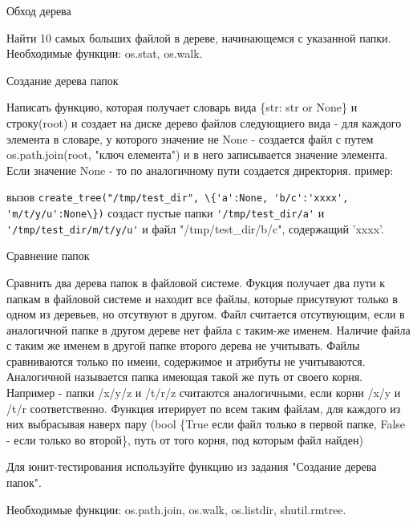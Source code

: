 \documentclass{article}
\begin{document}
\begin{center} Обход дерева \end{center}
Найти 10 самых больших файлой в дереве, начинающемся с указанной папки.
Необходимые функции: os.stat, os.walk.
\newpage

\begin{center} Создание дерева папок \end{center}
Написать функцию, которая получает словарь вида
\{str: str or None\} и строку(root) и создает на диске дерево файлов следующиего вида -
для каждого элемента в словаре, у которого значение не None - создается файл
с путем os.path.join(root, "ключ елемента") и в него записывается значение элемента.
Если значение None - то по аналогичному пути создается директория.
пример:

вызов \lstinline!create_tree("/tmp/test_dir", \{'a':None, 'b/c':'xxxx', 'm/t/y/u':None\})!
создаст пустые папки \lstinline!'/tmp/test_dir/a'! и \lstinline!'/tmp/test_dir/m/t/y/u'!
и файл "/tmp/test\_dir/b/c", содержащий 'xxxx'.

\newpage

\begin{center} Сравнение папок \end{center}
Сравнить два дерева папок в файловой системе. Фукция получает два пути к
папкам в файловой системе и находит все файлы, которые присутвуют только в
одном из деревьев, но отсутвуют в другом. Файл считается отсутвующим, если
в аналогичной папке в другом дереве нет файла с таким-же именем. Наличие файла
с таким же именем в другой папке второго дерева не учитывать. Файлы сравниваются
только по имени, содержимое и атрибуты не учитываются. Аналогичной называется
папка имеющая такой же путь от своего корня. Например - папки
/x/y/z и /t/r/z считаются аналогичными, если корни /x/y и /t/r соответственно.
Функция итерирует по всем таким файлам, для каждого из них выбрасывая наверх
пару (bool \{True если файл только в первой папке, False - если только во второй\},
 путь от того корня, под которым файл найден)

Для юнит-тестирования используйте функцию из задания "Создание дерева папок".

Необходимые функции: os.path.join, os.walk, os.listdir, shutil.rmtree.
\newpage
\end{document}
